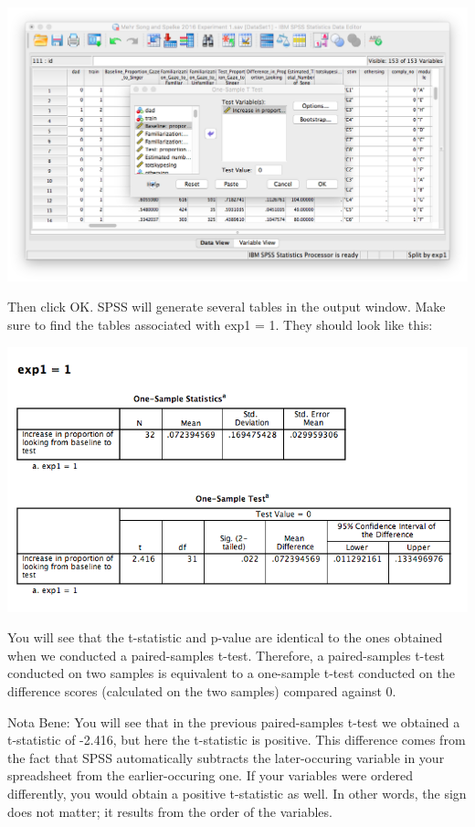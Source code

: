 \documentclass[
]{book}
\begin{document}
\includegraphics{img/6.4.32.png}

Then click {OK}. SPSS will generate several tables in the output window. Make sure to find the tables associated with exp1 = 1. They should look like this:

\includegraphics{img/6.4.33.png}

You will see that the t-statistic and p-value are identical to the ones obtained when we conducted a paired-samples t-test. Therefore, a paired-samples t-test conducted on two samples is equivalent to a one-sample t-test conducted on the difference scores (calculated on the two samples) compared against 0.

Nota Bene: You will see that in the previous paired-samples t-test we obtained a t-statistic of -2.416, but here the t-statistic is positive. This difference comes from the fact that SPSS automatically subtracts the later-occuring variable in your spreadsheet from the earlier-occuring one. If your variables were ordered differently, you would obtain a positive t-statistic as well. In other words, the sign does not matter; it results from the order of the variables.
\end{document}

